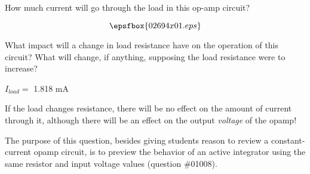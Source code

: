 

How much current will go through the load in this op-amp circuit?

$$\epsfbox{02694x01.eps}$$

What impact will a change in load resistance have on the operation of this circuit?  What will change, if anything, supposing the load resistance were to increase?







$I_{load} =$ 1.818 mA

\vskip 10pt

If the load changes resistance, there will be no effect on the amount of current through it, although there will be an effect on the output {\it voltage} of the opamp!







The purpose of this question, besides giving students reason to review a constant-current opamp circuit, is to preview the behavior of an active integrator using the same resistor and input voltage values (question \#01008).




